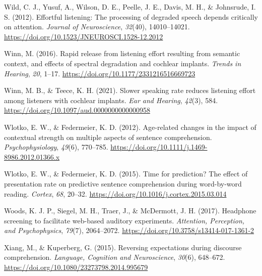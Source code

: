 \documentclass[a4paper, nobind]{templates/ociamthesis}
\newlength{\cslhangindent}
\newenvironment{CSLReferences}[2] %
 {%
  \setlength{\parindent}{0pt}
  \ifodd #1
  \let\oldpar\par
  \def\par{\hangindent=\cslhangindent\oldpar}
  \fi
  \setlength{\parskip}{1mm}
  \setlength{\baselineskip}{6mm}
 }%
 {}
\begin{document}
\begin{CSLReferences}{1}{0}
\leavevmode{}%
Wild, C. J., Yusuf, A., Wilson, D. E., Peelle, J. E., Davis, M. H., \& Johnsrude, I. S. (2012). {Effortful listening: The processing of degraded speech depends critically on attention}. \emph{Journal of Neuroscience}, \emph{32}(40), 14010--14021. \url{https://doi.org/10.1523/JNEUROSCI.1528-12.2012}

\leavevmode{}%
Winn, M. (2016). Rapid release from listening effort resulting from semantic context, and effects of spectral degradation and cochlear implants. \emph{Trends in Hearing}, \emph{20}, 1--17. \url{https://doi.org/10.1177/2331216516669723}

\leavevmode{}%
Winn, M. B., \& Teece, K. H. (2021). {Slower speaking rate reduces listening effort among listeners with cochlear implants}. \emph{Ear and Hearing}, \emph{42}(3), 584. \url{https://doi.org/10.1097/aud.0000000000000958}

\leavevmode{}%
Wlotko, E. W., \& Federmeier, K. D. (2012). Age-related changes in the impact of contextual strength on multiple aspects of sentence comprehension. \emph{Psychophysiology}, \emph{49}(6), 770--785. \url{https://doi.org/10.1111/j.1469-8986.2012.01366.x}

\leavevmode{}%
Wlotko, E. W., \& Federmeier, K. D. (2015). {Time for prediction? The effect of presentation rate on predictive sentence comprehension during word-by-word reading}. \emph{Cortex}, \emph{68}, 20--32. \url{https://doi.org/10.1016/j.cortex.2015.03.014}

\leavevmode{}%
Woods, K. J. P., Siegel, M. H., Traer, J., \& McDermott, J. H. (2017). {Headphone screening to facilitate web-based auditory experiments}. \emph{Attention, Perception, and Psychophysics}, \emph{79}(7), 2064--2072. \url{https://doi.org/10.3758/s13414-017-1361-2}

\leavevmode{}%
Xiang, M., \& Kuperberg, G. (2015). {Reversing expectations during discourse comprehension}. \emph{Language, Cognition and Neuroscience}, \emph{30}(6), 648--672. \url{https://doi.org/10.1080/23273798.2014.995679}

\end{CSLReferences}

\end{document}

